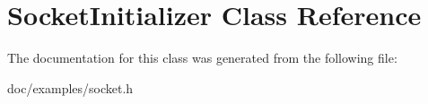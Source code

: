 \hypertarget{classSocketInitializer}{\section{Socket\-Initializer Class Reference}
\label{classSocketInitializer}
}


The documentation for this class was generated from the following file\-:\begin{DoxyCompactItemize}
\item 
doc/examples/socket.\-h\end{DoxyCompactItemize}
